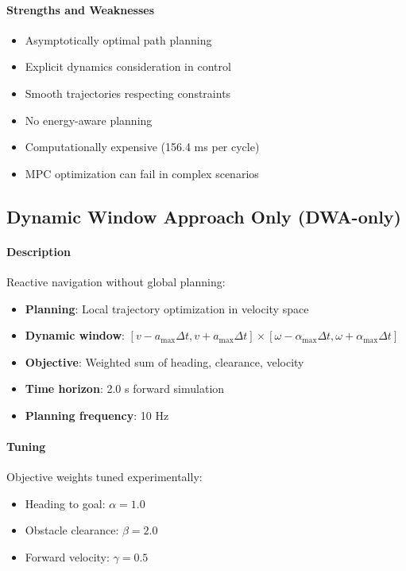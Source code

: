\paragraph{Strengths and Weaknesses}
\begin{itemize}
    \item[\textcolor{green}{+}] Asymptotically optimal path planning
    \item[\textcolor{green}{+}] Explicit dynamics consideration in control
    \item[\textcolor{green}{+}] Smooth trajectories respecting constraints
    \item[\textcolor{red}{--}] No energy-aware planning
    \item[\textcolor{red}{--}] Computationally expensive (156.4 ms per cycle)
    \item[\textcolor{red}{--}] MPC optimization can fail in complex scenarios
\end{itemize}

\subsection{Dynamic Window Approach Only (DWA-only)}

\paragraph{Description}
Reactive navigation without global planning:
\begin{itemize}
    \item \textbf{Planning}: Local trajectory optimization in velocity space
    \item \textbf{Dynamic window}: $[v - a_{\max}\Delta t, v + a_{\max}\Delta t] \times [\omega - \alpha_{\max}\Delta t, \omega + \alpha_{\max}\Delta t]$
    \item \textbf{Objective}: Weighted sum of heading, clearance, velocity
    \item \textbf{Time horizon}: 2.0 s forward simulation
    \item \textbf{Planning frequency}: 10 Hz
\end{itemize}

\paragraph{Tuning}
Objective weights tuned experimentally:
\begin{itemize}
    \item Heading to goal: $\alpha = 1.0$
    \item Obstacle clearance: $\beta = 2.0$
    \item Forward velocity: $\gamma = 0.5$
\end{itemize}

